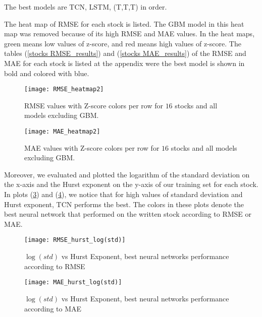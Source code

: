 \documentclass[12pt, A4]{article}
\begin{document}
The best models are TCN, LSTM, (T,T,T) in order.

The heat map of RMSE for each stock is listed. The GBM model in this heat map was removed because of its high RMSE and MAE values. In the heat maps, green means low values of z-score, and red means high values of z-score. The tables (\ref{stocks RMSE_results}) and (\ref{stocks MAE_results}) of the RMSE and MAE for each stock is listed at the appendix were the best model is shown in bold and colored with blue.

\begin{figure}[H]
	\centering
	\texttt{[image: RMSE\_heatmap2]}
	\caption{RMSE values with Z-score colors per row for $16$ stocks and all models excluding GBM.}
	\label{RMSE_heatmap}
\end{figure}

\begin{figure}[H]
	\centering
	\texttt{[image: MAE\_heatmap2]}
	\caption{MAE values with Z-score colors per row for $16$ stocks and all models excluding GBM.}
	\label{MAE_heatmap}
\end{figure}

Moreover, we evaluated and plotted the logarithm of the standard deviation on the x-axis and the Hurst exponent on the y-axis of our training set for each stock. In plots (\ref{RMSE_hurst_log(std)}) and (\ref{MAE_hurst_log(std)}), we notice that for high values of standard deviation and Hurst exponent, TCN performs the best. The colors in these plots denote the best neural network that performed on the written stock according to RMSE or MAE.

\begin{figure}[H]
	\centering
	\texttt{[image: RMSE\_hurst\_log(std)]}
	\caption{$\log(std)$ vs Hurst Exponent, best neural networks performance according to RMSE}
	\label{RMSE_hurst_log(std)}
\end{figure}

\begin{figure}[H]
	\centering
	\texttt{[image: MAE\_hurst\_log(std)]}
	\caption{$\log(std)$ vs Hurst Exponent, best neural networks performance according to MAE}
	\label{MAE_hurst_log(std)}
\end{figure}
\end{document}
